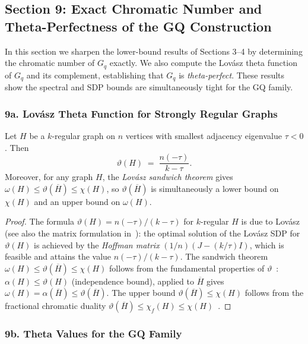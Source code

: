 \subsection*{Section 9: Exact Chromatic Number and Theta-Perfectness of the GQ Construction}

In this section we sharpen the lower-bound results of Sections 3--4 by determining the chromatic number of $G_q$ exactly.  We also compute the Lov\'asz theta function of $G_q$ and its complement, establishing that $G_q$ is \emph{theta-perfect}.  These results show the spectral and SDP bounds are simultaneously tight for the GQ family.

\subsubsection*{9a. Lov\'asz Theta Function for Strongly Regular Graphs}

\begin{lemma}\label{lem:theta-srg}
Let $H$ be a $k$-regular graph on $n$ vertices with smallest adjacency eigenvalue $\tau<0$.  Then
\[
  \vartheta(H) \;=\; \frac{n(-\tau)}{k-\tau}.
\]
Moreover, for any graph $H$, the \emph{Lov\'asz sandwich theorem} gives
$\omega(H)\le\vartheta(\overline{H})\le\chi(H)$,
so $\vartheta(\overline{H})$ is simultaneously a lower bound on $\chi(H)$ and an upper bound on $\omega(H)$.
\end{lemma}

\begin{proof}
The formula $\vartheta(H)=n(-\tau)/(k-\tau)$ for $k$-regular $H$ is due to Lov\'asz~\cite{Lovasz1979} (see also the matrix formulation in~\cite{BvM2022}): the optimal solution of the Lov\'asz SDP for $\vartheta(H)$ is achieved by the \emph{Hoffman matrix} $(1/n)(J - (k/\tau)I)$, which is feasible and attains the value $n(-\tau)/(k-\tau)$.  The sandwich theorem $\omega(H)\le\vartheta(\overline{H})\le\chi(H)$ follows from the fundamental properties of $\vartheta$~\cite{Lovasz1979}: $\alpha(H)\le\vartheta(H)$ (independence bound), applied to $\overline{H}$ gives $\omega(H)=\alpha(\overline{H})\le\vartheta(\overline{H})$.  The upper bound $\vartheta(\overline{H})\le\chi(H)$ follows from the fractional chromatic duality $\vartheta(\overline{H})\le\chi_f(H)\le\chi(H)$~\cite{Lovasz1979}.
\end{proof}

\subsubsection*{9b. Theta Values for the GQ Family}

